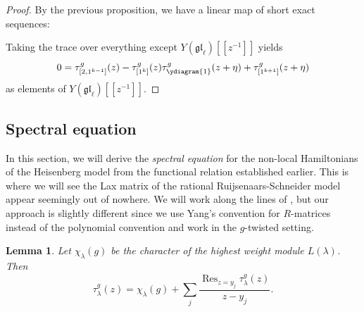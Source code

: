 \documentclass[11pt]{report}
\newtheorem{lemma}[theorem]{Lemma}
\theoremstyle{definition}
\theoremstyle{remark}
\theoremstyle{remark}
\begin{document}
\begin{proof}
By the previous proposition, we have a linear map of short exact sequences: \\
{\small
{}
}
Taking the trace over everything except $Y(\mathfrak{gl}_\ell)[[z^{-1}]]$ yields
\begin{equation*}
0 = \tau_{[2,1^{k-1}]}^g(z) - \tau_{[1^k]}^g(z) \tau_{\ydiagram{1}}^g(z+\eta) + \tau_{[1^{k+1}]}^g(z+\eta)
\end{equation*}
as elements of $Y(\mathfrak{gl}_\ell)[[z^{-1}]]$.
\end{proof}

\subsection{Spectral equation}

In this section, we will derive the \emph{spectral equation} for the non-local Hamiltonians of the Heisenberg model from the functional relation established earlier. This is where we will see the Lax matrix of the rational Ruijsenaars-Schneider model appear seemingly out of nowhere. We will work along the lines of \cite{book:arutyunov:betheAnsatz}, but our approach is slightly different since we use Yang's convention for $R$-matrices instead of the polynomial convention and work in the $g$-twisted setting.

\begin{lemma}\label{lemma:transferMatrixExpansion}
Let $\chi_\lambda(g)$ be the character of the highest weight module $L(\lambda)$. Then
\begin{equation*}
\tau_\lambda^g(z) = \chi_\lambda(g) + \sum_j \frac{\operatorname{Res}_{z=y_j} \tau_\lambda^g(z)}{z-y_j}.
\end{equation*}
\end{lemma}
\end{document}
